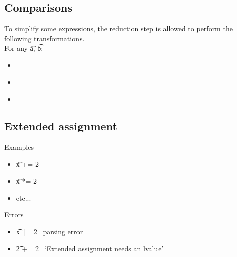 \subsection{Comparisons}
To simplify some expressions, the reduction step is allowed to perform the following transformations.\\
For any \t{a}, \t{b}:
\begin{itemize}
    \item {} \to\ 
    \item {} \to\ 
    \item {} \to\ 
\end{itemize}

\subsection{Extended assignment}
Examples
\begin{itemize}
    \item \t{x += 2} \to\ 
    \item \t{x *= 2} \to\ 
    \item etc...
\end{itemize}
Errors
\begin{itemize}
    \item \t{x []= 2} \to\ parsing error
    \item \t{2 += 2} \to\ `Extended assignment needs an lvalue'
\end{itemize}
